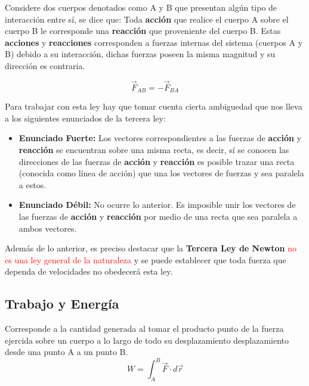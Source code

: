 \documentclass[/home/hernan/Documentos/Apuntes_mecanica_teorica/main.tex]{subfiles}
\begin{document}
	\begin{definition}
		Considere dos cuerpos denotados como A y B que presentan algún tipo de interacción entre sí, se dice que:
		Toda \textbf{acción} que realice el cuerpo A sobre el cuerpo B le corresponde una \textbf{reacción} que proveniente del cuerpo B. Estas \textbf{acciones} y \textbf{reacciones} corresponden a fuerzas internas del sistema (cuerpos A y B) debido a su interacción, dichas fuerzas poseen la misma magnitud y su dirección es contraria.
		
		\begin{equation}
			\vec{F}_{AB} = - \vec{F}_{BA}
			\label{eq: NThirdlaw}
		\end{equation}

		Para trabajar con esta ley hay que tomar cuenta cierta ambiguedad que nos lleva a los siguientes enunciados de la tercera ley:
		\begin{itemize}
			\item \textbf{Enunciado Fuerte: } Los vectores correspondientes a las fuerzas de \textbf{acción} y \textbf{reacción} se encuentran sobre una misma recta, es decir, sí se conocen las direcciones de las fuerzas de \textbf{acción} y \textbf{reacción} es posible trazar una recta (conocida como línea de acción) que una los vectores de fuerzas y sea paralela a estos.
			\item \textbf{Enunciado Débil: } No ocurre lo anterior. Es imposible unir los vectores de las fuerzas de \textbf{acción} y \textbf{reacción} por medio de una recta que sea paralela a ambos vectores.
		\end{itemize}

		Además de lo anterior, es preciso destacar que la \textbf{Tercera Ley de Newton} \textcolor{red}{no es una ley general de la naturaleza} y se puede establecer que toda fuerza que dependa de velocidades no obedecerá esta ley.
	\end{definition}

	\subsection{Trabajo y Energía}

	\begin{definition} Corresponde a la cantidad generada al tomar el producto punto de la fuerza ejercida sobre un cuerpo a lo largo de todo su desplazamiento desplazamiento desde una punto A a un punto B.
		\begin{equation}
			W = \int_{A}^{B} \vec{F} \cdot d\vec{r}
			\label{eq: work}
		\end{equation}
	\end{definition}
\end{document}
